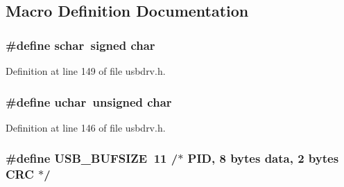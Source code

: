 \subsection{Macro Definition Documentation}
\hypertarget{mhvlib-_vusb-_console_2vusb_2usbdrv_8h_af2cbb84f982ea77dfbb738af3a027591}{
\subsubsection[{schar}]{\setlength{\rightskip}{0pt plus 5cm}\#define schar~signed char}}\label{mhvlib-_vusb-_console_2vusb_2usbdrv_8h_af2cbb84f982ea77dfbb738af3a027591}


Definition at line 149 of file usbdrv.\-h.

\hypertarget{mhvlib-_vusb-_console_2vusb_2usbdrv_8h_aa8ddf20cdd716b652e76e23e5e700893}{
\subsubsection[{uchar}]{\setlength{\rightskip}{0pt plus 5cm}\#define uchar~unsigned char}}\label{mhvlib-_vusb-_console_2vusb_2usbdrv_8h_aa8ddf20cdd716b652e76e23e5e700893}


Definition at line 146 of file usbdrv.\-h.

\hypertarget{mhvlib-_vusb-_console_2vusb_2usbdrv_8h_a1c541dbab181ea7bd3da61b892430988}{
\subsubsection[{U\-S\-B\-\_\-\-B\-U\-F\-S\-I\-Z\-E}]{\setlength{\rightskip}{0pt plus 5cm}\#define U\-S\-B\-\_\-\-B\-U\-F\-S\-I\-Z\-E~11  /$\ast$ P\-I\-D, 8 bytes data, 2 bytes C\-R\-C $\ast$/}}\label{mhvlib-_vusb-_console_2vusb_2usbdrv_8h_a1c541dbab181ea7bd3da61b892430988}


